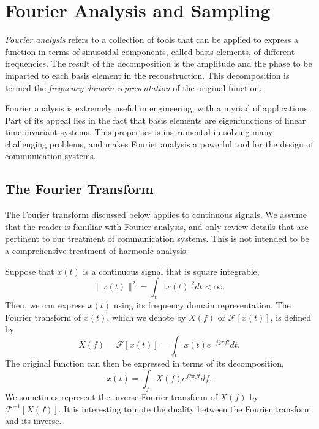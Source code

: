 \chapter{Fourier Analysis and Sampling}
\label{chapter:FourierAnalysisSampling}

\emph{Fourier analysis} refers to a collection of tools that can be applied to express a function in terms of sinusoidal components, called basis elements, of different frequencies.
The result of the decomposition is the amplitude and the phase to be imparted to each basis element in the reconstruction.
This decomposition is termed the \emph{frequency domain representation} of the original function.

Fourier analysis is extremely useful in engineering, with a myriad of applications.
Part of its appeal lies in the fact that basis elements are eigenfunctions of linear time-invariant systems.
This properties is instrumental in solving many challenging problems, and makes Fourier analysis a powerful tool for the design of communication systems.


\section{The Fourier Transform}

The Fourier transform discussed below applies to continuous signals.
We assume that the reader is familiar with Fourier analysis, and only review details that are pertinent to our treatment of communication systems.
This is not intended to be a comprehensive treatment of harmonic analysis.

Suppose that $x(t)$ is a continuous signal that is square integrable,
\begin{equation} \label{equation:L2Condition}
\| x(t) \|^2 = \int_t | x(t) |^2 dt < \infty .
\end{equation}
Then, we can express $x(t)$ using its frequency domain representation.
The Fourier transform of $x(t)$, which we denote by $X(f)$ or $\mathcal{F} [x(t)]$, is defined by
\begin{equation} \label{equation:FourierTransform}
X(f) = \mathcal{F} [x(t)]
= \int_t x(t) e^{-j 2 \pi f t} dt .
\end{equation}
The original function can then be expressed in terms of its decomposition,
\begin{equation} \label{equation:InverseFourierTransform}
x(t) = \int_f X(f) e^{j 2 \pi f t} df .
\end{equation}
We sometimes represent the inverse Fourier transform of $X(f)$ by $\mathcal{F}^{-1} [X(f)]$.
It is interesting to note the duality between the Fourier transform and its inverse.


